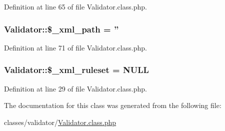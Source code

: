 Definition at line 65 of file Validator.\-class.\-php.

\hypertarget{classValidator_a69a5bdd50a59f7d9daab2ea702036277}{
\subsubsection[{\$\-\_\-xml\-\_\-path}]{\setlength{\rightskip}{0pt plus 5cm}Validator\-::\$\-\_\-xml\-\_\-path = ''}}\label{classValidator_a69a5bdd50a59f7d9daab2ea702036277}


Definition at line 71 of file Validator.\-class.\-php.

\hypertarget{classValidator_a45a0aaa905493683be7fc01a80837a26}{
\subsubsection[{\$\-\_\-xml\-\_\-ruleset}]{\setlength{\rightskip}{0pt plus 5cm}Validator\-::\$\-\_\-xml\-\_\-ruleset = N\-U\-L\-L}}\label{classValidator_a45a0aaa905493683be7fc01a80837a26}


Definition at line 29 of file Validator.\-class.\-php.



The documentation for this class was generated from the following file\-:\begin{DoxyCompactItemize}
\item 
classes/validator/\hyperlink{Validator_8class_8php}{Validator.\-class.\-php}\end{DoxyCompactItemize}
